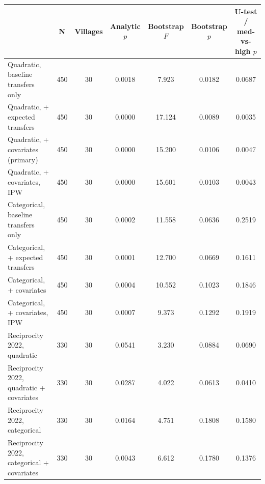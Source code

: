 \begin{tabular}{l*{6}{c}}
\toprule
            &           N&    Villages&Analytic $p$&Bootstrap $F$&Bootstrap $p$&U-test / med-vs-high $p$\\
\midrule
Quadratic, baseline transfers only&         450&          30&      0.0018&       7.923&      0.0182&      0.0687\\
Quadratic, + expected transfers&         450&          30&      0.0000&      17.124&      0.0089&      0.0035\\
Quadratic, + covariates (primary)&         450&          30&      0.0000&      15.200&      0.0106&      0.0047\\
Quadratic, + covariates, IPW&         450&          30&      0.0000&      15.601&      0.0103&      0.0043\\
Categorical, baseline transfers only&         450&          30&      0.0002&      11.558&      0.0636&      0.2519\\
Categorical, + expected transfers&         450&          30&      0.0001&      12.700&      0.0669&      0.1611\\
Categorical, + covariates&         450&          30&      0.0004&      10.552&      0.1023&      0.1846\\
Categorical, + covariates, IPW&         450&          30&      0.0007&       9.373&      0.1292&      0.1919\\
Reciprocity 2022, quadratic&         330&          30&      0.0541&       3.230&      0.0884&      0.0690\\
Reciprocity 2022, quadratic + covariates&         330&          30&      0.0287&       4.022&      0.0613&      0.0410\\
Reciprocity 2022, categorical&         330&          30&      0.0164&       4.751&      0.1808&      0.1580\\
Reciprocity 2022, categorical + covariates&         330&          30&      0.0043&       6.612&      0.1780&      0.1376\\
\bottomrule
\end{tabular}
